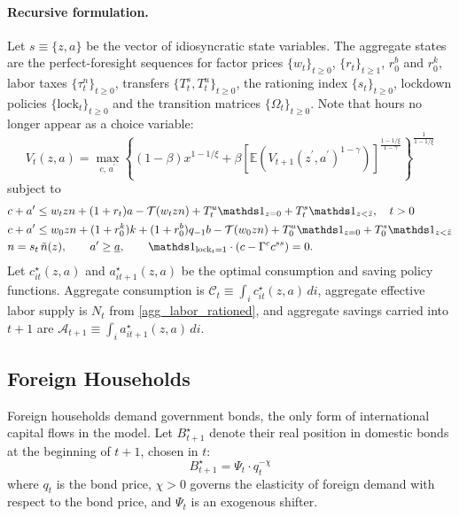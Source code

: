 \paragraph{Recursive formulation.} Let $s\equiv\{z,a\}$ be the vector of
idiosyncratic state variables. The aggregate states are the perfect-foresight
sequences for factor prices $\{w_t\}_{t\geq0}$, $\{r_t\}_{t\geq1}$, $r^b_0$ and
$r^k_0$, labor taxes $\{\tau^n_t\}_{t\geq0}$, transfers
$\{T^s_t,T^u_t\}_{t\geq0}$, the rationing index $\{s_t\}_{t\geq0}$, lockdown
policies $\{\text{lock}_t\}_{t\geq0}$ and the transition matrices
$\{\Omega_t\}_{t\geq0}$. Note that hours no longer appear as a choice variable:
\begin{equation}
    V_{t}(z,a) = \max_{c,\,a^\prime}  \left\{(1-\beta)x^{1-1/\xi} + \beta \left[\mathbb{E}\left( V_{t+1}(z^\prime, a^\prime)^{1-\gamma}\right) \right]^{\frac{1-1/\xi}{1-\gamma}} \right\}^{\frac{1}{1-1/\xi}}
\end{equation}
subject to
\begin{align*}
        & c + a^\prime\leq  w_{t} z n + (1+r_t) a - \mathcal{T}(w_{t} z n) + T_{t}^u \Ind_{z=0} + T^s_{t}\Ind_{z<\bar z}, \quad t>0\\
    & c + a^\prime \leq  w_0 z n + (1+r_0^k) k + (1+r_0^b) q_{-1} b - \mathcal{T}(w_{0} z n) + T_{0}^u \Ind_{z=0} + T^s_{0} \Ind_{z<\bar z}\\
    & n = s_t\,\tilde n(z), \qquad a^\prime\geq \underline{a}, \qquad
      \Ind_{\text{lock}_t=1}\cdot\left(c - \Gamma^c c^{ss}\right) = 0 .
\end{align*}
Let $c^\star_{it}(z,a)$ and $a^\star_{it+1}(z,a)$ be the optimal consumption and
saving policy functions. Aggregate consumption is
$\mathcal{C}_t\equiv\int_i c^\star_{it}(z,a)\,di$, aggregate effective labor
supply is $N_t$ from \eqref{agg_labor_rationed}, and aggregate savings carried
into $t+1$ are $\mathcal{A}_{t+1}\equiv\int_i a^\star_{it+1}(z,a)\,di$.

\subsection{Foreign Households}

Foreign households demand government bonds, the only form of international
capital flows in the model. Let $B^\star_{t+1}$ denote their real position in
domestic bonds at the beginning of $t+1$, chosen in $t$:
\begin{equation} \label{foreign_demand}
B_{t+1}^\star = \Psi_t \cdot q_t^{-\chi}
\end{equation}
where $q_t$ is the bond price, $\chi>0$ governs the elasticity of foreign demand
with respect to the bond price, and $\Psi_t$ is an exogenous shifter.

